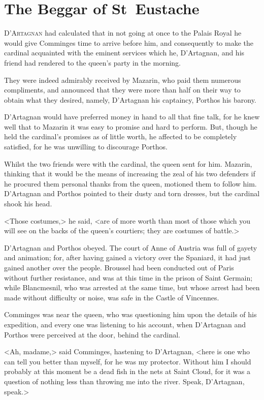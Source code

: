 \chapter{The Beggar of St~Eustache}

 \lettrine{D}{'Artagnan} had calculated that in not going at once to the Palais Royal he would give Comminges time to arrive before him, and consequently to make the cardinal acquainted with the eminent services which he, D'Artagnan, and his friend had rendered to the queen's party in the morning.

They were indeed admirably received by Mazarin, who paid them numerous compliments, and announced that they were more than half on their way to obtain what they desired, namely, D'Artagnan his captaincy, Porthos his barony.

D'Artagnan would have preferred money in hand to all that fine talk, for he knew well that to Mazarin it was easy to promise and hard to perform. But, though he held the cardinal's promises as of little worth, he affected to be completely satisfied, for he was unwilling to discourage Porthos.

Whilst the two friends were with the cardinal, the queen sent for him. Mazarin, thinking that it would be the means of increasing the zeal of his two defenders if he procured them personal thanks from the queen, motioned them to follow him. D'Artagnan and Porthos pointed to their dusty and torn dresses, but the cardinal shook his head.

<Those costumes,> he said, <are of more worth than most of those which you will see on the backs of the queen's courtiers; they are costumes of battle.>

D'Artagnan and Porthos obeyed. The court of Anne of Austria was full of gayety and animation; for, after having gained a victory over the Spaniard, it had just gained another over the people. Broussel had been conducted out of Paris without further resistance, and was at this time in the prison of Saint Germain; while Blancmesnil, who was arrested at the same time, but whose arrest had been made without difficulty or noise, was safe in the Castle of Vincennes.

Comminges was near the queen, who was questioning him upon the details of his expedition, and every one was listening to his account, when D'Artagnan and Porthos were perceived at the door, behind the cardinal.

<Ah, madame,> said Comminges, hastening to D'Artagnan, <here is one who can tell you better than myself, for he was my protector. Without him I should probably at this moment be a dead fish in the nets at Saint Cloud, for it was a question of nothing less than throwing me into the river. Speak, D'Artagnan, speak.>

